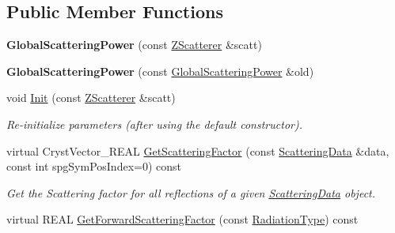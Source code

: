 \subsection*{Public Member Functions}
\begin{DoxyCompactItemize}
\item 
\mbox{\label{class_obj_cryst_1_1_global_scattering_power_acb09756b2191173fdd48356c77e325bc}} 
{\bfseries Global\+Scattering\+Power} (const \mbox{\hyperlink{class_obj_cryst_1_1_z_scatterer}{Z\+Scatterer}} \&scatt)
\item 
\mbox{\label{class_obj_cryst_1_1_global_scattering_power_a9a494d9a254eaaf7bb1525bfb7a1ad14}} 
{\bfseries Global\+Scattering\+Power} (const \mbox{\hyperlink{class_obj_cryst_1_1_global_scattering_power}{Global\+Scattering\+Power}} \&old)
\item 
\mbox{\label{class_obj_cryst_1_1_global_scattering_power_a8f47e4dd26899ab2fcedd5f6b844317d}} 
void \mbox{\hyperlink{class_obj_cryst_1_1_global_scattering_power_a8f47e4dd26899ab2fcedd5f6b844317d}{Init}} (const \mbox{\hyperlink{class_obj_cryst_1_1_z_scatterer}{Z\+Scatterer}} \&scatt)
\begin{DoxyCompactList}\small\item\em Re-\/initialize parameters (after using the default constructor). \end{DoxyCompactList}\item 
virtual Cryst\+Vector\+\_\+\+R\+E\+AL \mbox{\hyperlink{class_obj_cryst_1_1_global_scattering_power_af81844742d8cfdca7dec979a08e4abf0}{Get\+Scattering\+Factor}} (const \mbox{\hyperlink{class_obj_cryst_1_1_scattering_data}{Scattering\+Data}} \&data, const int spg\+Sym\+Pos\+Index=0) const
\begin{DoxyCompactList}\small\item\em Get the Scattering factor for all reflections of a given \mbox{\hyperlink{class_obj_cryst_1_1_scattering_data}{Scattering\+Data}} object. \end{DoxyCompactList}\item 
virtual R\+E\+AL \mbox{\hyperlink{class_obj_cryst_1_1_global_scattering_power_a76cf0e6d0bb30b0f7036cb6b65b45410}{Get\+Forward\+Scattering\+Factor}} (const \mbox{\hyperlink{namespace_obj_cryst_a48fe50a094c607f8897378934d3d73ef}{Radiation\+Type}}) const

\end{DoxyCompactItemize}
